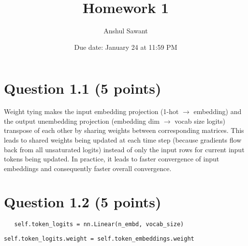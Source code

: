 \documentclass{article}
\title{Homework 1}
\author{Anshul Sawant}
\date{Due date: January 24 at 11:59 PM}
\begin{document}
\maketitle

\section*{Question 1.1 (5 points)}
Weight tying makes the input embedding projection (1-hot $\rightarrow$ embedding) and the output unembedding projection (embedding dim $\rightarrow$ vocab size logits) transpose of each other by sharing weights between corresponding matrices. This leads to shared weights being updated at each time step (because gradients flow back from all unsaturated logits) instead of only the input rows for current input tokens being updated. In practice, it leads to faster convergence of input embeddings and consequently faster overall convergence.
\section*{Question 1.2 (5 points)}

\verb|   self.token_logits = nn.Linear(n_embd, vocab_size)|

\verb|self.token_logits.weight = self.token_embeddings.weight|
\end{document}

